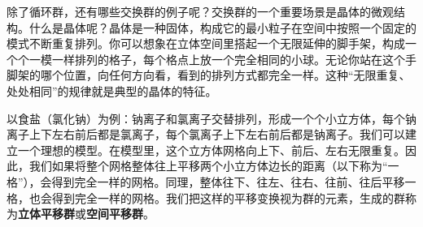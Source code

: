 \documentclass[12pt,UTF8,fontset=none]{ctexbook}
\begin{document}
除了循环群，还有哪些交换群的例子呢？交换群的一个重要场景是晶体的微观结构。什么是晶体呢？晶体是一种固体，构成它的最小粒子在空间中按照一个固定的模式不断重复排列。你可以想象在立体空间里搭起一个无限延伸的脚手架，构成一个个一模一样排列的格子，每个格点上放一个完全相同的小球。无论你站在这个手脚架的哪个位置，向任何方向看，看到的排列方式都完全一样。这种“无限重复、处处相同”的规律就是典型的晶体的特征。

以食盐（氯化钠）为例：钠离子和氯离子交替排列，形成一个个小立方体，每个钠离子上下左右前后都是氯离子，每个氯离子上下左右前后都是钠离子。我们可以建立一个理想的模型。在模型里，这个立方体网格向上下、前后、左右无限重复。因此，我们如果将整个网格整体往上平移两个小立方体边长的距离（以下称为“一格”），会得到完全一样的网格。同理，整体往下、往左、往右、往前、往后平移一格，也会得到完全一样的网格。我们把这样的平移变换视为群的元素，生成的群称为\textbf{立体平移群}或\textbf{空间平移群}。
\end{document}
